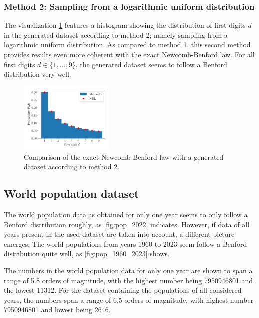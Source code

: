 \documentclass[a4paper,10pt, twocolumn]{article}
\begin{document}
\subsubsection{Method 2: Sampling from a logarithmic uniform distribution}
The visualization \cref{fig:gen_method_2} features a histogram showing the distribution of first digits $d$ in the generated dataset according to method 2; namely sampling from a logarithmic uniform distribution. As compared to method 1, this second method provides results even more coherent with the exact Newcomb-Benford law. For all first digits $d \in \{1,\dots,9\}$, the generated dataset seems to follow a Benford distribution very well.

\begin{figure}[h]
	\centering
	\includegraphics[width=0.4\textwidth]{figures/gen_method_2.pdf}
	\caption{Comparison of the exact Newcomb-Benford law with a generated dataset according to method 2.}
	\label{fig:gen_method_2}
\end{figure}

\subsection{World population dataset}
The world population data as obtained for only one year seems to only follow a Benford distribution roughly, as \cref{fig:pop_2022} indicates. However, if data of all years present in the used dataset are taken into account, a different picture emerges: The world populations from years 1960 to 2023 seem follow a Benford distribution quite well, as \cref{fig:pop_1960_2023} shows.

The numbers in the world population data for only one year are shown to span a range of 5.8 orders of magnitude, with the highest number being 7950946801 and the lowest 11312. For the dataset containing the populations of all considered years, the numbers span a range of 6.5 orders of magnitude, with highest number 7950946801 and lowest being 2646.
\end{document}
